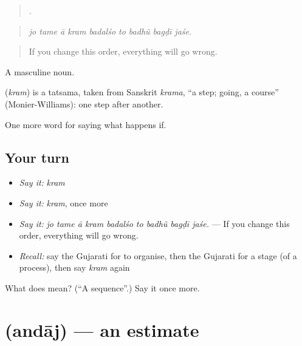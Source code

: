\begin{quote}
        .
\end{quote}

\begin{quote}
\emph{jo tame ā kram badalśo to badhũ bagḍī jaśe.}
\end{quote}

\begin{quote}
If you change this order, everything will go wrong.
\end{quote}

A masculine noun.

\begin{cousinweb}
\textbf{} (\emph{kram}) is a tatsama, taken from Sanskrit \emph{krama}, \textquotedblleft{}a step; going, a course\textquotedblright{} (Monier-Williams): one step after another.
\end{cousinweb}

\begin{grammarlens}[title={What you've built}]
One more word for saying what happens if.
\end{grammarlens}

\subsection*{Your turn}
\begin{itemize}
\raggedright
  \item \emph{Say it:} \emph{kram}
  \item \emph{Say it:} \emph{kram}, once more
  \item \emph{Say it:} \emph{jo tame ā kram badalśo to badhũ bagḍī jaśe.} — If you change this order, everything will go wrong.
  \item \emph{Recall:} say the Gujarati for to organise, then the Gujarati for a stage (of a process), then say \emph{kram} again
\end{itemize}

\begin{tcolorbox}[breakable,colback=teal!4,colframe=teal!35!black,title={Before you move on}]
What does  mean? (\textquotedblleft{}A sequence\textquotedblright{}.) Say it once more.
\end{tcolorbox}
\section[\texorpdfstring{\gu{અંદાજ} (andāj)}{અંદાજ (andāj)}]{ (andāj) — an estimate}

